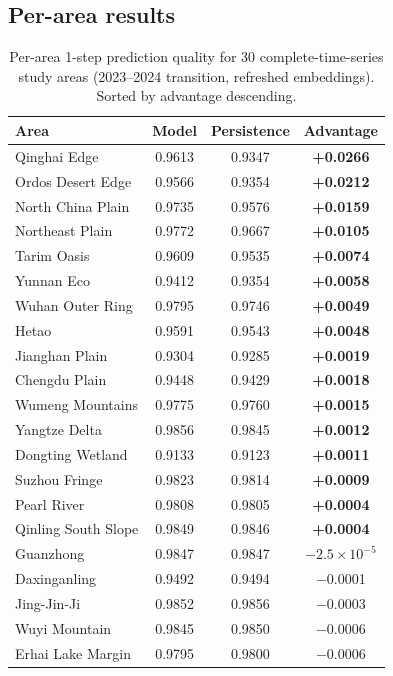 \documentclass{article}
\begin{document}
\subsection{Per-area results}

\begin{table}[htbp]
\centering
\caption{Per-area 1-step prediction quality for 30 complete-time-series study areas (2023--2024 transition, refreshed embeddings). Sorted by advantage descending.}
\label{tab:perarea}
\small
\begin{tabular}{lccc}
\toprule
Area & Model & Persistence & Advantage \\
\midrule
Qinghai Edge & 0.9613 & 0.9347 & \textbf{+0.0266} \\
Ordos Desert Edge & 0.9566 & 0.9354 & \textbf{+0.0212} \\
North China Plain & 0.9735 & 0.9576 & \textbf{+0.0159} \\
Northeast Plain & 0.9772 & 0.9667 & \textbf{+0.0105} \\
Tarim Oasis & 0.9609 & 0.9535 & \textbf{+0.0074} \\
Yunnan Eco & 0.9412 & 0.9354 & \textbf{+0.0058} \\
Wuhan Outer Ring & 0.9795 & 0.9746 & \textbf{+0.0049} \\
Hetao & 0.9591 & 0.9543 & \textbf{+0.0048} \\
Jianghan Plain & 0.9304 & 0.9285 & \textbf{+0.0019} \\
Chengdu Plain & 0.9448 & 0.9429 & \textbf{+0.0018} \\
Wumeng Mountains & 0.9775 & 0.9760 & \textbf{+0.0015} \\
Yangtze Delta & 0.9856 & 0.9845 & \textbf{+0.0012} \\
Dongting Wetland & 0.9133 & 0.9123 & \textbf{+0.0011} \\
Suzhou Fringe & 0.9823 & 0.9814 & \textbf{+0.0009} \\
Pearl River & 0.9808 & 0.9805 & \textbf{+0.0004} \\
Qinling South Slope & 0.9849 & 0.9846 & \textbf{+0.0004} \\
Guanzhong & 0.9847 & 0.9847 & $-2.5\times10^{-5}$ \\
Daxinganling & 0.9492 & 0.9494 & $-$0.0001 \\
Jing-Jin-Ji & 0.9852 & 0.9856 & $-$0.0003 \\
Wuyi Mountain & 0.9845 & 0.9850 & $-$0.0006 \\
Erhai Lake Margin & 0.9795 & 0.9800 & $-$0.0006 \\

\end{tabular}
\end{table}
\end{document}
